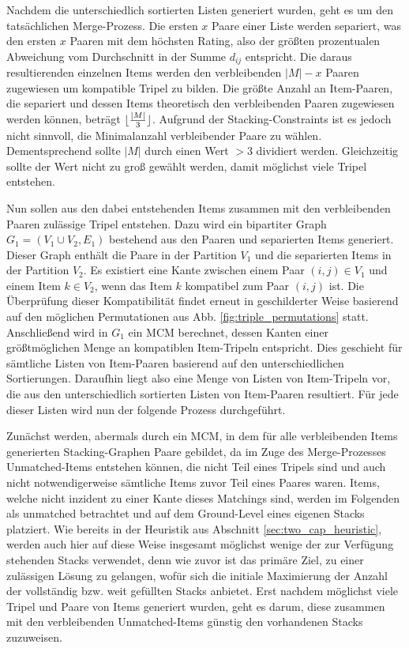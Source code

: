 Nachdem die unterschiedlich sortierten Listen generiert wurden, geht es um den tatsächlichen Merge-Prozess.
Die ersten $x$ Paare einer Liste werden separiert, was den ersten $x$ Paaren mit dem höchsten Rating, also der größten
prozentualen Abweichung vom Durchschnitt in der Summe $d_{ij}$ entspricht. Die daraus resultierenden einzelnen Items werden den verbleibenden $|M| - x$ Paaren zugewiesen um kompatible Tripel zu bilden. Die größte Anzahl an Item-Paaren, die separiert und dessen Items theoretisch den verbleibenden Paaren zugewiesen werden können, beträgt $\lfloor\frac{|M|}{3}\rfloor$. Aufgrund der Stacking-Constraints ist es jedoch nicht sinnvoll, die Minimalanzahl verbleibender Paare zu wählen. Dementsprechend sollte $|M|$ durch einen Wert $> 3$ dividiert werden. Gleichzeitig sollte der Wert nicht zu groß gewählt werden, damit möglichst viele Tripel entstehen.

Nun sollen aus den dabei entstehenden Items zusammen mit den verbleibenden Paaren zulässige Tripel entstehen.
Dazu wird ein bipartiter Graph $G_1 = (V_1 \cup V_2, E_1)$ bestehend aus den Paaren und separierten Items generiert.
Dieser Graph enthält die Paare in der Partition $V_1$ und die separierten Items in der Partition $V_2$.
Es existiert eine Kante zwischen einem Paar $(i, j) \in V_1$ und einem Item $k \in V_2$, wenn das Item $k$ kompatibel zum Paar
$(i, j)$ ist. Die Überprüfung dieser Kompatibilität findet erneut in geschilderter Weise basierend auf den möglichen Permutationen
aus Abb. \ref{fig:triple_permutations} statt.
Anschließend wird in $G_1$ ein \textsc{MCM} berechnet, dessen Kanten einer größtmöglichen Menge an kompatiblen Item-Tripeln entspricht. Dies geschieht für sämtliche Listen von Item-Paaren basierend auf den unterschiedlichen Sortierungen.
Daraufhin liegt also eine Menge von Listen von Item-Tripeln vor, die aus den unterschiedlich sortierten Listen von Item-Paaren resultiert. Für jede dieser Listen wird nun der folgende Prozess durchgeführt.

Zunächst werden, abermals durch ein \textsc{MCM}, in dem für alle verbleibenden Items generierten Stacking-Graphen
Paare gebildet, da im Zuge des Merge-Prozesses Unmatched-Items entstehen können, die nicht Teil eines Tripels sind und auch nicht notwendigerweise sämtliche Items zuvor Teil eines Paares waren. Items, welche nicht inzident zu einer Kante dieses Matchings sind, werden im Folgenden als unmatched betrachtet und auf dem Ground-Level eines eigenen Stacks platziert.
Wie bereits in der Heuristik aus Abschnitt \ref{sec:two_cap_heuristic}, werden auch hier auf diese Weise insgesamt möglichst wenige der zur Verfügung stehenden Stacks verwendet, denn wie zuvor ist das primäre Ziel, zu einer zulässigen Lösung zu gelangen, wofür sich die initiale Maximierung der Anzahl der vollständig bzw. weit gefüllten Stacks anbietet. Erst nachdem möglichst viele Tripel und Paare von Items generiert wurden, geht es darum, diese zusammen mit den verbleibenden Unmatched-Items günstig den vorhandenen Stacks zuzuweisen.

